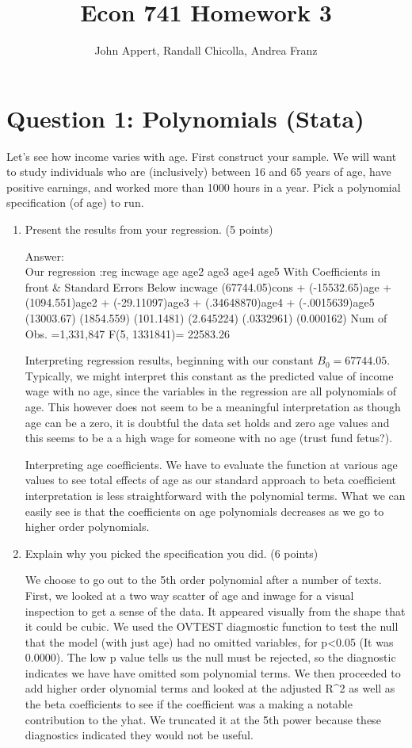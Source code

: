 \documentclass{article}
\begin{document}
\title{Econ 741 Homework 3}
\author{John Appert, Randall Chicolla, Andrea Franz}
\maketitle

\section{Question 1:  Polynomials (Stata)}
Let’s see how income varies with age. First construct your sample. We will want to
study individuals who are (inclusively) between 16 and 65 years of age, have positive earnings, and worked more than 1000 hours in a year. Pick a polynomial specification (of age) to run.

\begin{enumerate}[label=\alph*]
\item Present the results from your regression.  (5 points)

Answer:\\
Our regression :reg incwage age age2 age3 age4 age5
With Coefficients in front & Standard Errors Below
incwage (67744.05)cons + (-15532.65)age + (1094.551)age2 + (-29.11097)age3 + (.34648870)age4 + (-.0015639)age5
        (13003.67)       (1854.559)       (101.1481)       (2.645224)        (.0332961)        (0.000162)
Num of Obs. =1,331,847
F(5, 1331841)= 22583.26


Interpreting regression results, beginning with our constant $B_0 =67744.05$. Typically, we might interpret this constant as the predicted value of income wage with no age, since the variables in the regression are all polynomials of age. This however does not seem to be a meaningful interpretation as though age can be a zero, it is doubtful the data set holds and zero age values and this seems to be a a high wage for someone with no age (trust fund fetus?).
 
Interpreting age coefficients. We have to evaluate the function at various age values to see total effects of age as our standard approach to beta coefficient interpretation is less straightforward with the polynomial terms. What we can easily see is that the coefficients on age polynomials decreases as we go to higher order polynomials. 


\item Explain why you picked the specification you did.  (6 points)

We choose to go out to the 5th order polynomial after a number of texts. First, we looked at a two way scatter of age and inwage for a visual inspection to get a sense of the data. It appeared visually from the shape that it could be cubic. We used the OVTEST diagmostic function to test the null that the model (with just age) had no omitted variables, for p<0.05 (It was 0.0000). The low p value tells us the null must be rejected, so the diagnostic indicates we have have omitted som polynomial terms. We then proceeded to add higher order olynomial terms and looked at the adjusted R^2 as well as the beta coefficients to see if the coefficient was a making a notable contribution to the yhat. We truncated it at the 5th power because these diagnostics indicated they would not be useful.



\end{enumerate}
\end{document}

